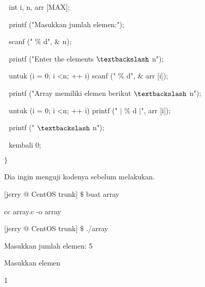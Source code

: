 \noindent 
 \hspace*{0.5in}  $  $ $  $ $  $int i, n, arr [MAX]; \par
\noindent 
 \hspace*{0.5in}  $  $ $  $ $  $printf ("Masukkan jumlah elemen:"); \par
\noindent 
 \hspace*{0.5in}  $  $ $  $ $  $scanf (" $  \%  $ d",  $  \&  $ n); \par
\noindent 
 \hspace*{0.5in}  $  $ $  $ $  $printf ("Enter the elements  $  \textbackslash  $ n"); \par
\noindent 
 \hspace*{0.5in}  $  $ $  $ $  $untuk (i = 0; i <n; ++ i) scanf (" $  \%  $ d",  $  \&  $ arr [i]); \par
\noindent 
 \hspace*{0.5in}  $  $ $  $ $  $printf ("Array memiliki elemen berikut  $  \textbackslash  $ n"); \par
\noindent 
 \hspace*{0.5in}  $  $ $  $ $  $untuk (i = 0; i <n; ++ i) printf (" $  \vert  $ $  \%  $ d  $  \vert  $", arr [i]); \par
\noindent 
 \hspace*{0.5in}  $  $ $  $ $  $printf (" $  \textbackslash  $ n"); \par
\noindent 
 \hspace*{0.5in}  $  $ $  $ $  $kembali 0; \par
\noindent 
 \hspace*{0.5in}  $  \}  $ \par
\noindent 
Dia ingin menguji kodenya sebelum melakukan. \par
\noindent 
 \hspace*{0.5in} [jerry @ CentOS trunk]  $  \$  $ buat array \par
\noindent 
 \hspace*{0.5in} cc array.c -o array \par
\noindent 
 \hspace*{0.5in} [jerry @ CentOS trunk]  $  \$  $ ./array \par
\noindent 
 \hspace*{0.5in} Masukkan jumlah elemen: 5 \par
\noindent 
 \hspace*{0.5in} Masukkan elemen \par
\noindent 
 \hspace*{0.5in}  \hspace*{0.5in} 1 \par

